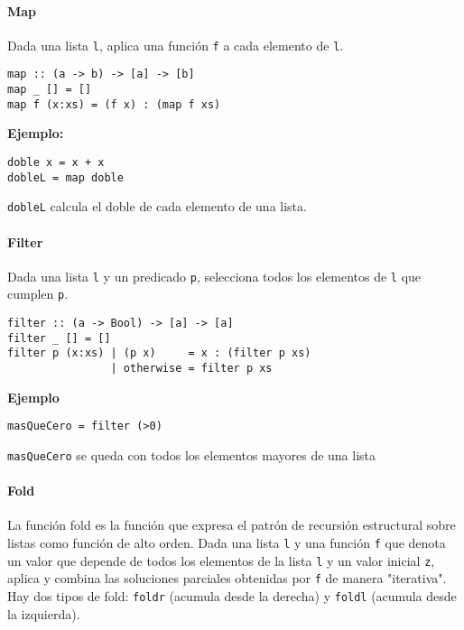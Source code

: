 \paragraph{Map}
Dada una lista \texttt{l}, aplica una función \texttt{f} a cada elemento de \texttt{l}.
\begin{centrado}
	\begin{verbatim}
map :: (a -> b) -> [a] -> [b]
map _ [] = []
map f (x:xs) = (f x) : (map f xs)
	\end{verbatim}
\end{centrado} 

\textbf{Ejemplo:}
\begin{centrado}
	\begin{verbatim}
doble x = x + x
dobleL = map doble  
	\end{verbatim}
\end{centrado} 

\texttt{dobleL} calcula el doble de cada elemento de una lista.

\paragraph{Filter}
Dada una lista \texttt{l} y un predicado \texttt{p}, selecciona todos los elementos de \texttt{l} que cumplen \texttt{p}.

\begin{centrado}
	\begin{verbatim}
filter :: (a -> Bool) -> [a] -> [a]
filter _ [] = []
filter p (x:xs) | (p x)     = x : (filter p xs)
                | otherwise = filter p xs  
	\end{verbatim}
\end{centrado}

\textbf{Ejemplo}
\begin{centrado}
	\begin{verbatim}
masQueCero = filter (>0)
	\end{verbatim}
\end{centrado}

\texttt{masQueCero} se queda con todos los elementos mayores de una lista

\paragraph{Fold}
La función {fold} es la función que expresa el patrón de recursión estructural sobre listas como función de alto orden. Dada una lista \texttt{l} y una función \texttt{f} que denota un valor que depende de todos los elementos de la lista \texttt{l} y un valor inicial \texttt{z}, aplica y combina las soluciones parciales obtenidas por \texttt{f} de manera "iterativa". 
Hay dos tipos de fold: \texttt{foldr} (acumula desde la derecha) y \texttt{foldl} (acumula desde la izquierda).

